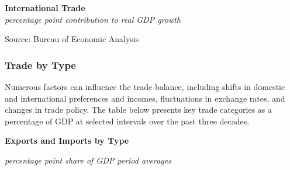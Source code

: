 \documentclass{report}
\makeatletter
\newcommand{\tbllink}[1]{\href{https://raw.githubusercontent.com/bdecon/US-chartbook/master/chartbook/data/#1}{\faTable}}
\newcommand*\short[1]{\expandafter\@gobbletwo\number\numexpr#1\relax}
\newcommand{\sbar}[4]{
		\addplot[ybar stacked, bar width=2.3pt, draw opacity=0, fill=#1] 
			table [x=#2, y=#3, col sep=comma]{#4};}
\newcommand{\dateaxisticks}{
		date coordinates in=x, axis line style={draw=none},
		xmax={2024-01-31},
		max space between ticks=40,	    
		xtick={{1990-01-01}, {1992-01-01}, {1994-01-01}, 
			{1996-01-01}, {1998-01-01}, {2000-01-01}, 
			{2002-01-01}, {2004-01-01}, {2006-01-01},
			{2008-01-01}, {2010-01-01}, {2012-01-01}, {2014-01-01},
		    {2016-01-01}, {2018-01-01}, {2020-01-01}, {2022-01-01}, 
		    {2024-01-01}, {2026-01-01}},
		minor xtick={{1989-01-01}, {1991-01-01}, {1993-01-01},
			{1995-01-01}, {1997-01-01}, {1999-01-01}, 
			{2001-01-01}, {2003-01-01}, {2005-01-01}, {2007-01-01},
		    {2009-01-01}, {2011-01-01}, {2013-01-01}, {2015-01-01},
		    {2017-01-01}, {2019-01-01}, {2021-01-01}, {2023-01-01}, 
		    {2025-01-01}, {2027-01-01}},
		enlarge y limits={0.06}, enlarge x limits={0.01},
		xticklabel style={align=center, yshift=-2pt}, tick label style={inner sep=0pt},
		}
\newcommand{\bbar}[2]{extra #1 ticks = {{#2}}, extra #1 tick labels = ,
		extra #1 tick style = {grid=major, grid style={thick, black!25}},}
\newcommand{\rbars}{
		\fill[color=black!10] (axis cs:{1990-07-01},\pgfkeysvalueof{/pgfplots/ymin})
			rectangle (axis cs:{1991-03-01}, \pgfkeysvalueof{/pgfplots/ymax});
		\fill[color=black!10] (axis cs:{2007-12-01},\pgfkeysvalueof{/pgfplots/ymin})
			rectangle (axis cs:{2009-07-01}, \pgfkeysvalueof{/pgfplots/ymax});
		\fill[color=black!10] (axis cs:{2001-03-01},\pgfkeysvalueof{/pgfplots/ymin})
			rectangle (axis cs:{2001-11-01}, \pgfkeysvalueof{/pgfplots/ymax});
		\fill[color=black!10] (axis cs:{2020-02-01},\pgfkeysvalueof{/pgfplots/ymin})
			rectangle (axis cs:{2020-05-01}, \pgfkeysvalueof{/pgfplots/ymax});}
\makeatother
\begin{document}
{\begin{minipage}{1.0\textwidth}
 
\vspace{1mm}

\normalsize \textbf{International Trade}\\
\footnotesize{\textit{percentage point contribution to real GDP growth}}
\vspace{5.2cm}

\hspace{1.5mm} 

\footnotesize{Source: Bureau of Economic Analysis} \hfill \tbllink{nx.csv}
\end{minipage}
\newpage
\begin{minipage}{1.0\textwidth} 
\subsubsection*{Trade by Type} 
\small Numerous factors can influence the trade balance, including shifts in domestic and international preferences and incomes, fluctuations in exchange rates, and changes in trade policy. The table below presents key trade categories as a percentage of GDP at selected intervals over the past three decades.
\vspace{1mm}

\normalsize \textbf{Exports and Imports by Type}\\
\footnotesize{\textit{percentage point share of GDP \hspace{38mm} period averages}\\ 
 \setlength{\tabcolsep}{3.0pt} \color{black!90}
	{\renewcommand{\arraystretch}{1.58}
\hspace*{-2mm} \begin{tabular}{p{43.5mm} R{7.1mm} R{7.1mm} R{7.1mm} R{7.1mm} R{7.1mm} 
		   R{7.1mm} R{7.1mm} R{7.1mm} }
			  \hline
		\end{tabular}}\vspace{-2mm}
		
}
\end{minipage}}
\end{document}
